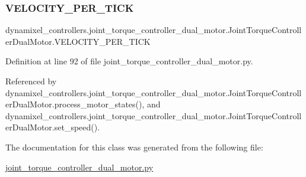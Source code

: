 \subsubsection{\texorpdfstring{V\+E\+L\+O\+C\+I\+T\+Y\+\_\+\+P\+E\+R\+\_\+\+T\+I\+CK}{VELOCITY\_PER\_TICK}}
{\footnotesize\ttfamily dynamixel\+\_\+controllers.\+joint\+\_\+torque\+\_\+controller\+\_\+dual\+\_\+motor.\+Joint\+Torque\+Controller\+Dual\+Motor.\+V\+E\+L\+O\+C\+I\+T\+Y\+\_\+\+P\+E\+R\+\_\+\+T\+I\+CK}



Definition at line 92 of file joint\+\_\+torque\+\_\+controller\+\_\+dual\+\_\+motor.\+py.



Referenced by dynamixel\+\_\+controllers.\+joint\+\_\+torque\+\_\+controller\+\_\+dual\+\_\+motor.\+Joint\+Torque\+Controller\+Dual\+Motor.\+process\+\_\+motor\+\_\+states(), and dynamixel\+\_\+controllers.\+joint\+\_\+torque\+\_\+controller\+\_\+dual\+\_\+motor.\+Joint\+Torque\+Controller\+Dual\+Motor.\+set\+\_\+speed().



The documentation for this class was generated from the following file\+:\begin{DoxyCompactItemize}
\item 
\hyperlink{joint__torque__controller__dual__motor_8py}{joint\+\_\+torque\+\_\+controller\+\_\+dual\+\_\+motor.\+py}\end{DoxyCompactItemize}
